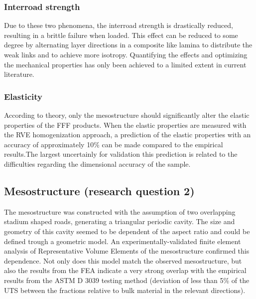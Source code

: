 \subsubsection{Interroad strength} 
Due to these two phenomena, the interroad strength is drastically reduced, resulting in a brittle failure when loaded. This effect can be reduced to some degree by alternating layer directions in a composite like lamina to distribute the weak links and to achieve more isotropy. 
Quantifying the effects and optimizing the mechanical properties has only been achieved to a limited extent in current literature. 
\subsubsection{Elasticity} 
According to theory, only the mesostructure should significantly alter the elastic properties of the FFF products. When the elastic properties are measured with the RVE homogenization approach, a prediction of the elastic properties with an accuracy of approximately 10\% can be made compared to the empirical results.The largest uncertainly for validation this prediction is related to the difficulties regarding the dimensional accuracy of the sample.

\subsection{Mesostructure (research question 2)}
The mesostructure was constructed with the assumption of two overlapping stadium shaped roads, generating a triangular periodic cavity. The size and geometry of this cavity seemed to be dependent of the aspect ratio and could be defined trough a geometric model. An experimentally-validated finite element analysis of Representative Volume Elements of the mesostructure confirmed this dependence. Not only does this model match the observed mesostructure, but also the results from the FEA indicate a very strong overlap with the empirical results from the ASTM D 3039 testing method (deviation of less than 5\% of the UTS between the fractions relative to bulk material in the relevant directions). 

